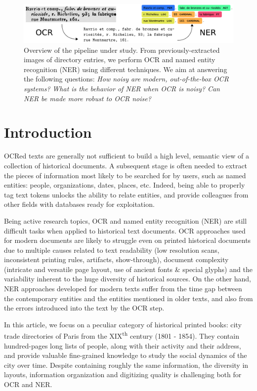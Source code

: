 \begin{figure}[!h]
    \centering
    \includegraphics[width=.9\textwidth]{figs/overview-intro.pdf}
    \caption{%
    Overview of the pipeline under study.
    From previously-extracted images of directory entries, 
    we perform OCR and named entity recognition (NER) using different techniques.
    We aim at answering the following questions:
    \emph{How noisy are modern, out-of-the-box OCR systems?}
    \emph{What is the behavior of NER when OCR is noisy?}
    \emph{Can NER be made more robust to OCR noise?}
    }
    \label{<label>}
\end{figure}
\clearpage%

\section{Introduction}

OCRed texts are generally not sufficient to build a high level, semantic view of a collection of historical documents.
A subsequent stage is often needed to extract the pieces of information most likely to be searched for by users, such as named entities: people, organizations, dates, places, etc.
Indeed, being able to properly tag text tokens unlocks the ability to relate entities, and provide colleagues from other fields with databases ready for exploitation.

Being active research topics, OCR and named entity recognition (NER) are still difficult tasks when applied to historical text documents.
OCR approaches used for modern documents are likely to struggle even on printed historical documents due to multiple causes related to text readability (low resolution scans, inconsistent printing rules, artifacts, show-through), document complexity (intricate and versatile page layout, use of ancient fonts \& special glyphs) and the variability inherent to the huge diversity of historical sources.
On the other hand, NER approaches developed for modern texts suffer from the time gap between the contemporary entities and the entities mentioned in older texts, and also from the errors introduced into the text by the OCR step.

In this article, we focus on a peculiar category of historical printed books: city trade directories of Paris from the XIX\textsuperscript{th} century (1801 - 1854).
They contain hundred-pages long lists of people, along with their activity and their address, and provide valuable fine-grained knowledge to study the social dynamics of the city over time.
Despite containing roughly the same information, the diversity in layouts, information organization and digitizing quality is challenging both for OCR and NER.

